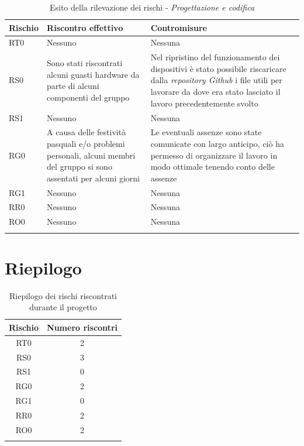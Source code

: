 \documentclass[./PianodiProgetto.tex]{subfiles}
\begin{document}
\begin{longtable}{|p{15mm}|p{60mm}|p{60mm}|}
	\hline \textbf{Rischio} & \textbf{Riscontro effettivo} & \textbf{Contromisure} \\
	
	\hline RT0 & Nessuno & Nessuna \\
	
	\hline RS0 & Sono stati riscontrati alcuni guasti hardware da parte di alcuni componenti del gruppo & Nel ripristino del funzionamento dei dispositivi è stato possibile riscaricare dalla \textit{repository Github} i file utili per lavorare da dove era stato lasciato il lavoro precedentemente svolto \\
	
	\hline RS1 & Nessuno & Nessuna \\
	
	\hline RG0 & A causa delle festività pasquali e/o problemi personali, alcuni membri del gruppo si sono assentati per alcuni giorni & Le eventuali assenze sono state comunicate con largo anticipo, ciò ha permesso di organizzare il lavoro in modo ottimale tenendo conto delle assenze \\
	
	\hline RG1 & Nessuno & Nessuna \\
	
	\hline RR0 & Nessuno & Nessuna \\
	
	\hline RO0 & Nessuno & Nessuna \\
	
	\hline
	\caption{Esito della rilevazione dei rischi - \textit{Progettazione e codifica}}
\end{longtable}

\section{Riepilogo}

\setlength\LTleft{40mm}

\begin{longtable}{|c|c|}
	\hline \textbf{Rischio} & \textbf{Numero riscontri} \\
	
	\hline RT0 & 2 \\
	
	\hline RS0 & 3 \\
	
	\hline RS1 & 0 \\
	
	\hline RG0 & 2 \\
	
	\hline RG1 & 0 \\
	
	\hline RR0 & 2 \\
	
	\hline RO0 & 2 \\
	
	\hline
	\caption{Riepilogo dei rischi riscontrati durante il progetto}
\end{longtable}
\end{document}
